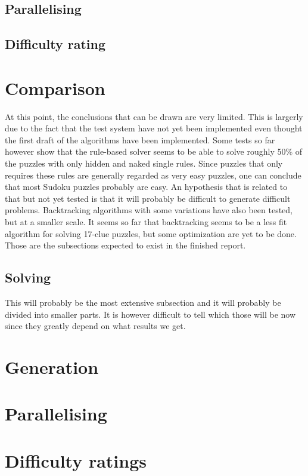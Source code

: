 \documentclass[a4paper,11pt]{kth-mag}
\begin{document}
\subsection{Parallelising}

\subsection{Difficulty rating}

\section{Comparison}

At this point, the conclusions that can be drawn are very limited.
This is largerly due to the fact that the test system have not yet been implemented even thought the first draft of the algorithms have been implemented.
Some tests so far however show that the rule-based solver seems to be able to solve roughly 50\% of the puzzles with only hidden and naked single rules.
Since puzzles that only requires these rules are generally regarded as very easy puzzles, one can conclude that most Sudoku puzzles probably are easy.
An hypothesis that is related to that but not yet tested is that it will probably be difficult to generate difficult problems.
Backtracking algorithms with some variations have also been tested, but at a smaller scale.
It seems so far that backtracking seems to be a less fit algorithm for solving 17-clue puzzles, but some optimization are yet to be done. 
Those are the subsections expected to exist in the finished report.
\subsection{Solving}

This will probably be the most extensive subsection and it will probably be divided into smaller parts.
It is however difficult to tell which those will be now since they greatly depend on what results we get.
\section{Generation}

\section{Parallelising}

\section{Difficulty ratings}
\end{document}
